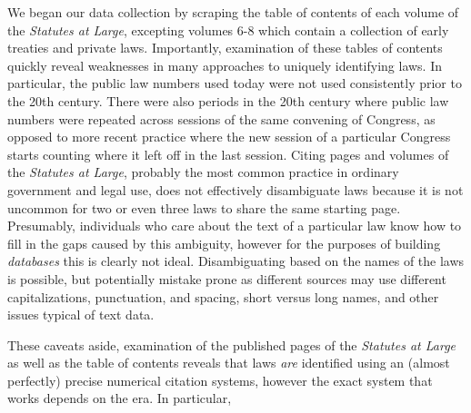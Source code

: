 \documentclass[fleqn,10pt]{wlscirep}
\begin{document}
We began our data collection by scraping the table of contents of each volume of the \emph{Statutes at Large}, excepting volumes 6-8 which contain a collection of early treaties and private laws. Importantly, examination of these tables of contents quickly reveal weaknesses in many approaches to uniquely identifying laws. In particular, the public law numbers used today were not used consistently prior to the 20th century. There were also periods in the 20th century where public law numbers were repeated across sessions of the same convening of Congress, as opposed to more recent practice where the new session of a particular Congress starts counting where it left off in the last session. Citing pages and volumes of the \emph{Statutes at Large}, probably the most common practice in ordinary government and legal use, does not effectively disambiguate laws because it is not uncommon for two or even three laws to share the same starting page. Presumably, individuals who care about the text of a particular law know how to fill in the gaps caused by this ambiguity, however for the purposes of building \textit{databases} this is clearly not ideal. Disambiguating based on the names of the laws is possible, but potentially mistake prone as different sources may use different capitalizations, punctuation, and spacing, short versus long names, and other issues typical of text data. 

These caveats aside, examination of the published pages of the \emph{Statutes at Large} as well as the table of contents reveals that laws \textit{are} identified using an (almost perfectly) precise numerical citation systems, however the exact system that works depends on the era. In particular,
\end{document}
